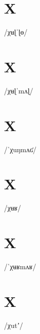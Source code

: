 \documentclass[10pt,a4paper,twoside]{book}
\begin{document}
\section*{X}

\begin{multicols}{3}
 {/χʉɭˈɭɵ/} {}
\end{multicols}

\section*{X}

\begin{multicols}{3}
 {/χʉɭˈmʌɭ/} {}
\end{multicols}

\section*{X}

\begin{multicols}{3}
 {/ˈχuŋmʌʛ/} {}
\end{multicols}

\section*{X}

\begin{multicols}{3}
 {/χʉʁ/} {}
\end{multicols}

\section*{X}

\begin{multicols}{3}
 {/ˈχʉʁmʌʁ/} {}
\end{multicols}

\section*{X}

\begin{multicols}{3}
 {/χutʼ/} {}
\end{multicols}
\end{document}
